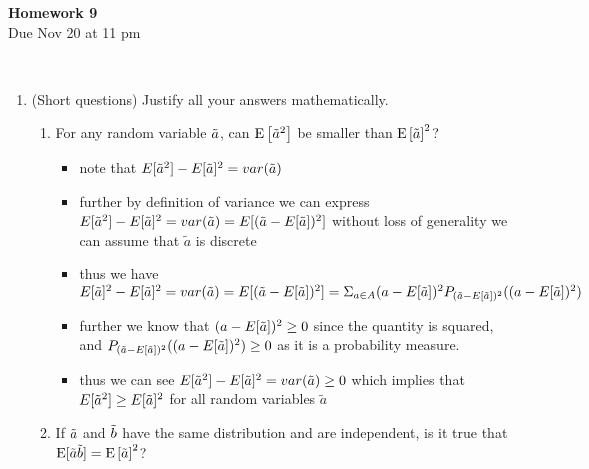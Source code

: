 \documentclass[12pt,twoside]{article}
\begin{document}
\begin{center}
{\large{\textbf{Homework 9}} } \\%
Due Nov 20 at 11 pm
\\
\end{center}
\\

\begin{enumerate}

\item (Short questions) 
Justify all your answers mathematically.
\begin{enumerate}
\item For any random variable $\tilde{  a }$, can $\mathrm{E}\left[ \tilde{  a }^2 \right]$ be smaller than $\mathrm{E}\left[ \tilde{  a } \right]^2$?  
\begin{itemize}
    \item note that $E[\Tilde{a}^2]-E[\Tilde{a}]^2=var(\Tilde{a})$
    \item further by definition of variance we can express $E[\Tilde{a}^2]-E[\Tilde{a}]^2=\\var(\Tilde{a})=E[(\Tilde{a}-E[\Tilde{a}])^2]$ without loss of generality we can assume that $\tilde{a}$ is discrete \item thus we have  $E[\Tilde{a}]^2-E[\Tilde{a}]^2=\\var(\Tilde{a})=E[(\Tilde{a}-E[\Tilde{a}])^2]=\Sigma_{a\in A}(a-E[\Tilde{a}])^2P_{(\Tilde{a}-E[\Tilde{a}])^2}((a-E[\Tilde{a}])^2)$
    \item further we know that $(a-E[\Tilde{a}])^2\geq 0$ since the quantity is squared, and  $P_{(\Tilde{a}-E[\Tilde{a}])^2}((a-E[\Tilde{a}])^2)\geq 0$ as it is a probability measure. 
    \item thus we can see $E[\Tilde{a}^2]-E[\Tilde{a}]^2=var(\Tilde{a})\geq 0$ which implies that $E[\Tilde{a}^2]\geq E[\Tilde{a}]^2$ for all random variables $\tilde{a}$
    
\end{itemize}


\item If $\tilde{  a }$ and $\tilde{  b }$ have the same distribution and are independent, is it true that $\mathrm{E} [\tilde{  a } \tilde{  b }] = \mathrm{E}\left[ \tilde{  a } \right]^2$?

\begin{itemize}


\end{itemize}
\end{enumerate}
\end{enumerate}
\end{document}
